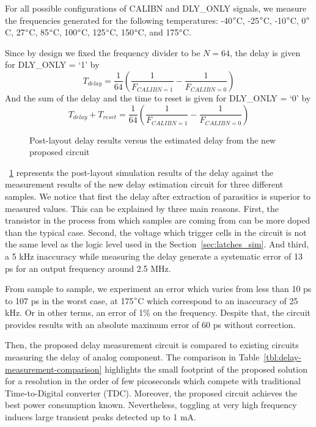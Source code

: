 For all possible configurations of CALIBN and DLY\_ONLY signals, we measure the frequencies generated for the following temperatures: -40$\degree$C, -25$\degree$C, -10$\degree$C, 0$\degree$C, 27$\degree$C, 85$\degree$C, 100$\degree$C, 125$\degree$C, 150$\degree$C, and 175$\degree$C.

Since by design we fixed the frequency divider to be $N = 64$, the delay is given for DLY\_ONLY = `1' by
\begin{equation}
 T_{delay} = \frac{1}{64} \left(\frac{1}{F_{CALIBN=1}}-\frac{1}{F_{CALIBN=0}} \right)
\end{equation}
And the sum of the delay and the time to reset is given for DLY\_ONLY = `0' by
\begin{equation}
    T_{delay}+T_{reset} = \frac{1}{64} \left(\frac{1}{F_{CALIBN=1}}-\frac{1}{F_{CALIBN=0}} \right)
\end{equation}

\begin{figure}[htp]
    \centering
    
    \caption{Post-layout delay results versus the estimated delay from the new proposed circuit}
    \label{fig:delay_vs_meas}
\end{figure}

\figurename~\ref{fig:delay_vs_meas} represents the post-layout simulation results of the delay against the measurement results of the new delay estimation circuit for three different samples. We notice that first the delay after extraction of parasitics is superior to measured values. This can be explained by three main reasons. First, the transistor in the process from which samples are coming from can be more doped than the typical case. Second, the voltage which trigger cells in the circuit is not the same level as the logic level used in the Section~\ref{sec:latches_sim}. And third, a 5 kHz inaccuracy while measuring the delay generate a systematic error of 13 ps for an output frequency around 2.5 MHz.

From sample to sample, we experiment an error which varies from less than 10 ps to 107 ps in the worst case, at 175\(\degree\)C which correspond to an inaccuracy of 25 kHz. Or in other terms, an error of 1\% on the frequency. Despite that, the circuit provides results with an absolute maximum error of 60 ps without correction.

Then, the proposed delay measurement circuit is compared to existing circuits measuring the delay of analog component. The comparison in Table~\ref{tbl:delay-measurement-comparison} highlights the small footprint of the proposed solution for a resolution in the order of few picoseconds which compete with traditional Time-to-Digital converter (TDC). Moreover, the proposed circuit achieves the best power consumption known. Nevertheless, toggling at very high frequency induces large transient peaks detected up to 1 mA. 


